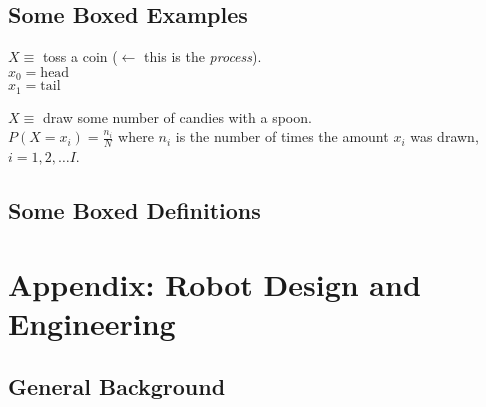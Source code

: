 \documentclass[11pt,letterpaper,twoside]{report}%
\begin{document}
\section{Some Boxed Examples}

\begin{example}
$X \equiv$ toss a coin ($\leftarrow$ this is the {\em process}).\\[1ex]
$x_0 = \textrm{head}$\\[1ex]
$x_1 = \textrm{tail}$\\[1ex]
\end{example}

\begin{example}
$X \equiv$ draw some number of candies with a spoon.\\[1ex]
$P(X=x_i) = \frac{n_i}{N}$ where $n_i$ is the number of times the amount $x_i$  was drawn, $i=1,2,\ldots I$.\\[1ex]
\end{example}

\section{Some Boxed Definitions}



\chapter*{Appendix: Robot Design and Engineering}

\section{General Background}
\end{document}
